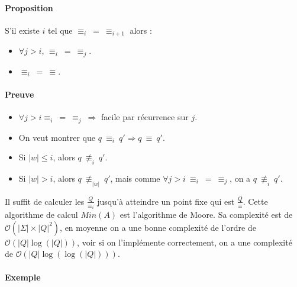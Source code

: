 

\paragraph{Proposition} %
\label{par:proposition}

S'il existe $i$ tel que $\equiv_i\ =\ \equiv_{i+1}$ alors :
\begin{itemize}
	\item $\forall j > i$, $\equiv_i\ =\ \equiv_j$.
	\item $\equiv_i\ =\ \equiv$.
\end{itemize}



\paragraph{Preuve} %
\label{par:preuve}

\begin{itemize}
	\item $\forall j > i \equiv_i\ =\ \equiv_j\ \Rightarrow$ facile par récurrence sur $j$.
	\item On veut montrer que $q\ \equiv_i\ q' \Rightarrow q\ \equiv\ q'$.
	\item Si $\left|w\right| \leq i$, alors $q\ \not \equiv_i \ q'$.
	\item Si $\left|w\right| > i$, alors $q\ \not \equiv_{\left|w\right|} \ q'$, mais comme $\forall j > i\ \equiv_i\ =\ \equiv_j$, on a $q\ \not \equiv_i\ q'$.
\end{itemize}


Il suffit de calculer les $\frac{Q}{\equiv_i}$ jusqu'à atteindre un point fixe qui est $\frac{Q}{\equiv}$. Cette algorithme de calcul $Min(A)$ est l'algorithme de Moore. Sa complexité est de $\mathcal{O}(\left|\Sigma\right| \times \left|Q\right|^2)$, en moyenne on a une bonne complexité de l'ordre de $\mathcal{O}(\left|Q\right|\log({\left|Q\right|}))$, voir si on l'implémente correctement, on a une complexité de $\mathcal{O}(\left|Q\right|\log( \log({\left|Q\right|}) ))$.


\paragraph{Exemple} %
\label{par:exemple}

